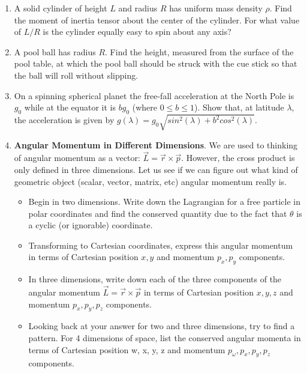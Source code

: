 \documentclass[fleqn]{article}
\begin{document}
\begin{enumerate}
    \item A solid cylinder of height $L$ and radius $R$ has uniform mass density $\rho$. Find the moment of inertia tensor about the center of the cylinder. For
    what value of $L/R$ is the cylinder equally easy to spin about any axis?


    \item A pool ball has radius $R$. Find the height, measured from the surface of the pool table, at which the pool ball should be struck with the cue
    stick so that the ball will roll without slipping.


    \item On a spinning spherical planet the free-fall acceleration at the North Pole is $g_0$ while at the equator it is $bg_0$ (where $0\leq b\leq 1$). 
    Show that, at latitude $\lambda$, the acceleration is given by $g(\lambda)=g_0 \sqrt{sin^2(\lambda)+b^2 cos^2(\lambda)}$.


    \item \textbf{Angular Momentum in Different Dimensions}. We are used to thinking of angular momentum as a vector:
    $\overrightarrow{L}=\overrightarrow{r} \times \overrightarrow{p}$. However, the cross product is only defined in three dimensions. Let us
    see if we can figure out what kind of geometric object (scalar, vector,
    matrix, etc) angular momentum really is.
    \begin{itemize}
      \item Begin in two dimensions. Write down the Lagrangian for a free
      particle in polar coordinates and find the conserved quantity due
      to the fact that $\theta$ is a cyclic (or ignorable) coordinate.

      \item Transforming to Cartesian coordinates, express this angular momentum in terms of Cartesian position
      $x, y$ and momentum $p_x, p_y$ components.

      \item In three dimensions, write down each of the three components of
      the angular momentum $\overrightarrow{L}=\overrightarrow{r} \times \overrightarrow{p}$ in terms of Cartesian position
      $x,y,z$ and momentum $p_x, p_y, p_z$ components.

      \item Looking back at your answer for two and three dimensions, try
      to find a pattern. For 4 dimensions of space, list the conserved
      angular momenta in terms of Cartesian position w, x, y, z and momentum $p_{\omega}, p_x, p_y,p_z$ components.


\end{itemize}
\end{enumerate}
\end{document}
